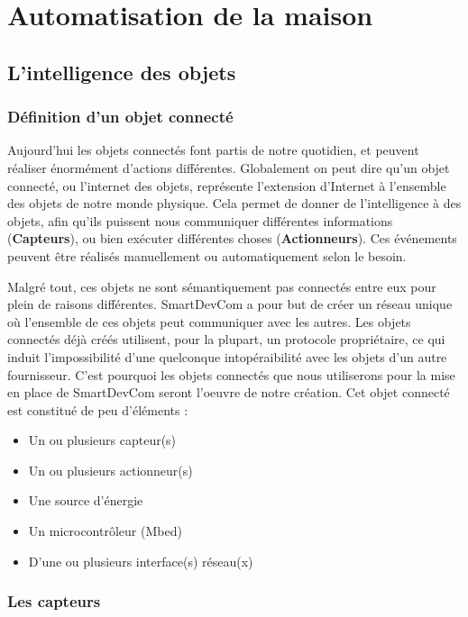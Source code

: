 \chapter{Automatisation de la maison}

\section{L’intelligence des objets}
	\subsection{Définition d’un objet connecté}
Aujourd'hui les objets connectés font partis de notre quotidien, et peuvent réaliser énormément 
d'actions différentes. Globalement on peut dire qu'un objet connecté, ou l'internet des objets, représente 
l'extension d'Internet à l'ensemble des objets de notre monde physique. Cela permet de donner de 
l'intelligence à des objets, afin qu'ils puissent nous communiquer différentes informations 
(\textbf{Capteurs}), ou bien exécuter différentes choses (\textbf{Actionneurs}). Ces événements peuvent être 
réalisés manuellement ou automatiquement selon le besoin.

Malgré tout, ces objets ne sont sémantiquement pas connectés entre eux pour plein de raisons différentes. 
SmartDevCom a pour but de créer un réseau unique où l'ensemble de ces objets peut communiquer avec les 
autres. Les objets connectés déjà créés utilisent, pour la plupart, un protocole propriétaire, ce qui induit 
l'impossibilité d'une quelconque intopéraibilité avec les objets d'un autre fournisseur. C'est pourquoi les 
objets connectés que nous utiliserons pour la mise en place de SmartDevCom seront l'oeuvre de notre création. 
Cet objet connecté est constitué de peu d'éléments :
\begin{itemize}
 \item Un ou plusieurs capteur(s)
 \item Un ou plusieurs actionneur(s)
 \item Une source d'énergie
 \item Un microcontrôleur (Mbed)
 \item D'une ou plusieurs interface(s) réseau(x)
\end{itemize}

	\subsection{Les capteurs}
	
